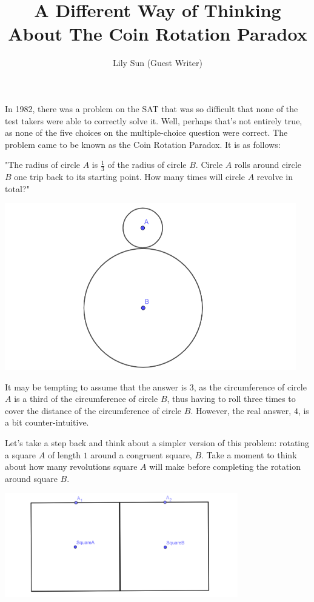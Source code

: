 \documentclass{article}
\title{A Different Way of Thinking About The Coin Rotation Paradox}
\author{Lily Sun (Guest Writer)}
\date{}
\begin{document}
\maketitle
In 1982, there was a problem on the SAT that was so difficult that none of the test takers were able to correctly solve it. Well, perhaps that's not entirely true, as none of the five choices on the multiple-choice question were correct. The problem came to be known as the Coin Rotation Paradox. It is as follows:

"The radius of circle $A$ is $\frac{1}{3}$ of the radius of circle $B$. Circle $A$ rolls around circle $B$ one trip back to its starting point. How many times will circle $A$ revolve in total?"

\begin{center}
\includegraphics[width=5in]{images/circleAandcircleB.png}
\end{center}

It may be tempting to assume that the answer is $3$, as the circumference of circle $A$ is a third of the circumference of circle $B$, thus having to roll three times to cover the distance of the circumference of circle $B$. However, the real answer, $4$, is a bit counter-intuitive.

Let's take a step back and think about a simpler version of this problem: rotating a square $A$ of length $1$ around a congruent square, $B$. Take a moment to think about how many revolutions square $A$ will make before completing the rotation around square $B$.

\begin{center}
\includegraphics[width=4in]{images/squareAandsquareB.png}
\end{center}
\end{document}
